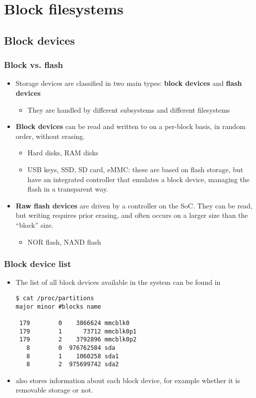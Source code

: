 \section{Block filesystems}

\subsection{Block devices}

\begin{frame}
  \frametitle{Block vs. flash}
  \begin{itemize}
  \item Storage devices are classified in two main types: {\bf block
      devices} and {\bf flash devices}
    \begin{itemize}
    \item They are handled by different subsystems and different
      filesystems
    \end{itemize}
  \item {\bf Block devices} can be read and written to on a per-block
    basis, in random order, without erasing.
    \begin{itemize}
    \item Hard disks, RAM disks
    \item USB keys, SSD, SD card, eMMC: these are based
      on flash storage, but have an integrated controller that
      emulates a block device, managing the flash in a transparent
      way.
    \end{itemize}
  \item {\bf Raw flash devices} are driven by a controller on the
      SoC. They can be read, but writing requires prior erasing,
      and often occurs on a larger size than the “block” size.
    \begin{itemize}
    \item NOR flash, NAND flash
    \end{itemize}
  \end{itemize}
\end{frame}

\begin{frame}[fragile]
  \frametitle{Block device list}
  \begin{itemize}
  \item The list of all block devices available in the system can be
    found in \\
\begin{verbatim}
$ cat /proc/partitions
major minor #blocks name

 179        0    3866624 mmcblk0
 179        1      73712 mmcblk0p1
 179        2    3792896 mmcblk0p2
   8        0  976762584 sda
   8        1    1060258 sda1
   8        2  975699742 sda2
\end{verbatim}
  \item {} also stores information about each block device,
     for example whether it is removable storage or not.
  \end{itemize}
\end{frame}

